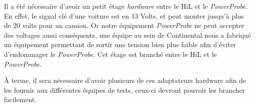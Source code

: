 \begin{remarque}
Il a été nécessaire d'avoir un petit étage \textit{hardware} entre le HiL et le \textit{PowerProbe}. En effet, le signal clé d'une voiture est en 13 Volts, et peut monter jusqu'à plus de 20 volts pour un camion. Or notre équipement \textit{PowerProbe} ne peut accepter des voltages aussi conséquents, une équipe au sein de Continental nous a fabriqué un équipement permettant de sortir une tension bien plus faible afin d'éviter d'endommager le \textit{PowerProbe}. Cet étage est branché entre le HiL et le \textit{PowerProbe}. 

À terme, il sera nécessaire d'avoir plusieurs de ces adaptateurs hardware afin de les fournir aux différentes équipes de tests, ceux-ci devront pouvoir les brancher facilement.
\end{remarque}
